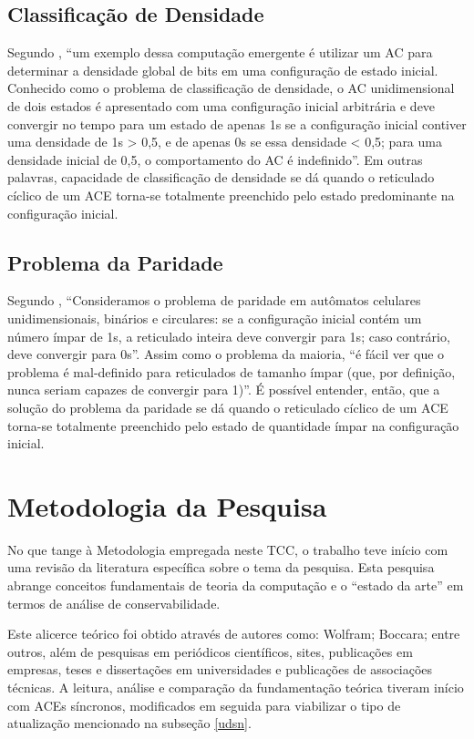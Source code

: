 \documentclass[a4paper,12pt]{ltxdoc}
\newcommand\tab[1][1cm]{\hspace*{#1}}
\begin{document}
\subsection{Classificação de Densidade} \label{dct}
Segundo \cite[p. 1]{capcarrere1996two}, ``um exemplo dessa computação emergente é utilizar um AC para determinar a densidade global de bits em uma configuração de estado inicial. Conhecido como o problema de classificação de densidade, o AC unidimensional de dois estados é apresentado com uma configuração inicial arbitrária e deve convergir no tempo para um estado de apenas 1s se a configuração inicial contiver uma densidade de 1s > 0,5, e de apenas 0s se essa densidade < 0,5; para uma densidade inicial de 0,5, o comportamento do AC é indefinido''. Em outras palavras, capacidade de classificação de densidade se dá quando o reticulado cíclico de um ACE torna-se totalmente preenchido pelo estado predominante na configuração inicial.

\subsection{Problema da Paridade} \label{parity-problem}
Segundo \cite[p. 1]{betel2012parity}, ``Consideramos o problema de paridade em autômatos celulares unidimensionais, binários e circulares: se a configuração inicial contém um número ímpar de 1s, a reticulado inteira deve convergir para 1s; caso contrário, deve convergir para 0s''. Assim como o problema da maioria, ``é fácil ver que o problema é mal-definido para reticulados de tamanho ímpar (que, por definição, nunca seriam capazes de convergir para 1)''. É possível entender, então, que a solução do problema da paridade se dá quando o reticulado cíclico de um ACE torna-se totalmente preenchido pelo estado de quantidade ímpar na configuração inicial.  

\section{Metodologia da Pesquisa}

No que tange à Metodologia empregada neste TCC, o trabalho teve início com uma revisão da literatura específica sobre o tema da pesquisa. Esta pesquisa abrange conceitos fundamentais de teoria da computação e o ``estado da arte'' em termos de análise de conservabilidade.

\tab Este alicerce teórico foi obtido através de autores como: Wolfram; Boccara;
entre outros, além de pesquisas em periódicos científicos, sites, publicações em empresas, teses e dissertações em universidades e publicações de associações técnicas.  A leitura, análise e comparação da fundamentação teórica tiveram início com ACEs síncronos, modificados em seguida para viabilizar o tipo de atualização mencionado na subseção \ref{udsn}.
\end{document}

